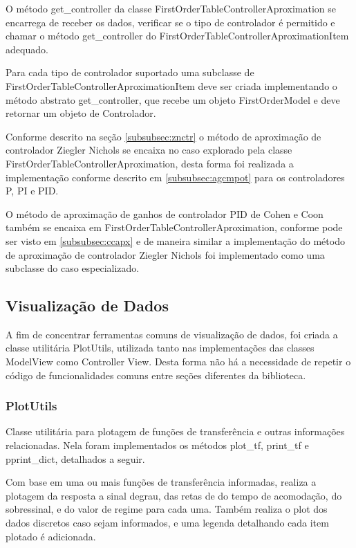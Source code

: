 O método get\_controller da classe FirstOrderTableControllerAproximation se encarrega de receber os dados, verificar
se o tipo de controlador é permitido e chamar o método get\_controller do FirstOrderTableControllerAproximationItem
adequado.

Para cada tipo de controlador suportado uma subclasse de FirstOrderTableControllerAproximationItem deve ser criada
implementando o método abstrato get\_controller, que recebe um objeto FirstOrderModel e deve retornar um objeto de
Controlador.


Conforme descrito na seção \ref{subsubsec:znctr} o método de aproximação de controlador Ziegler Nichols se encaixa no
caso explorado pela classe FirstOrderTableControllerAproximation, desta forma foi realizada a implementação conforme
descrito em \ref{subsubsec:agcmpot} para os controladores P, PI e PID\@.


O método de aproximação de ganhos de controlador PID de Cohen e Coon também se encaixa em
FirstOrderTableControllerAproximation, conforme pode ser visto em \ref{subsubsec:ccapx} e de maneira similar a
implementação do método de aproximação de controlador Ziegler Nichols foi implementado como uma subclasse do caso
especializado.

\subsection{Visualização de Dados}\label{subsec:dataviz}

A fim de concentrar ferramentas comuns de visualização de dados, foi criada a classe utilitária PlotUtils, utilizada
tanto nas implementações das classes ModelView como Controller View.
Desta forma não há a necessidade de repetir o código de funcionalidades comuns entre seções diferentes da biblioteca.

\subsubsection{PlotUtils}\label{subsubsec:devPlotUtils}
Classe utilitária para plotagem de funções de transferência e outras informações relacionadas.
Nela foram implementados os métodos plot\_tf, print\_tf e pprint\_dict, detalhados a seguir.

Com base em uma ou mais funções de transferência informadas, realiza a plotagem da resposta a sinal degrau, das retas de
do tempo de acomodação, do sobressinal, e do valor de regime para cada uma.
Também realiza o plot dos dados discretos caso sejam informados, e uma legenda detalhando cada item plotado é
adicionada.

